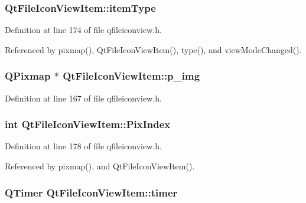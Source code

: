 \subsubsection{ {\bf Qt\-File\-Icon\-View\-Item::item\-Type}\hspace{0.3cm}{\tt  [protected]}}\label{classQtFileIconViewItem_QtFileIconViewItemp2}




Definition at line 174 of file qfileiconview.h.

Referenced by pixmap(), Qt\-File\-Icon\-View\-Item(), type(), and view\-Mode\-Changed().
\subsubsection{\setlength{\rightskip}{0pt plus 5cm}QPixmap $\ast$ {\bf Qt\-File\-Icon\-View\-Item::p\_\-img}}\label{classQtFileIconViewItem_QtFileIconViewItemo1}




Definition at line 167 of file qfileiconview.h.
\subsubsection{\setlength{\rightskip}{0pt plus 5cm}int {\bf Qt\-File\-Icon\-View\-Item::Pix\-Index}\hspace{0.3cm}{\tt  [protected]}}\label{classQtFileIconViewItem_QtFileIconViewItemp6}




Definition at line 178 of file qfileiconview.h.

Referenced by pixmap(), and Qt\-File\-Icon\-View\-Item().
\subsubsection{\setlength{\rightskip}{0pt plus 5cm}QTimer {\bf Qt\-File\-Icon\-View\-Item::timer}\hspace{0.3cm}{\tt  [protected]}}\label{classQtFileIconViewItem_QtFileIconViewItemp4}




